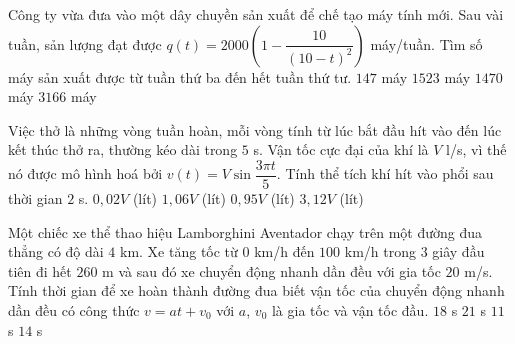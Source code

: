 \begin{ex}%
	Công ty vừa đưa vào một dây chuyền sản xuất để chế tạo máy tính mới. Sau vài tuần, sản lượng đạt được $q(t)=2000\left(1-\dfrac{10}{(10-t)^2}\right)$ máy/tuần. Tìm số máy sản xuất được từ tuần thứ ba đến hết tuần thứ tư. 
	\choice
	{$147$ máy}
	{\True $1523$ máy}
	{$1470$ máy}
	{$3166$ máy}
\end{ex}
\begin{ex}%
	Việc thở là những vòng tuần hoàn, mỗi vòng tính từ lúc bắt đầu hít vào đến lúc kết thúc thở ra, thường kéo dài trong $5$ s. Vận tốc cực đại của khí là $V$ l/s, vì thế nó được mô hình hoá bởi $v(t)=V\sin \dfrac{3\pi t}{5}$. Tính thể tích khí hít vào phổi sau thời gian $2$ s. 
	\choice
	{$0{,}02V$ (lít)}
	{\True $1{,}06V$ (lít)}
	{$0{,}95V$ (lít)}
	{$3{,}12V$ (lít)}
\end{ex}
\begin{ex}%
	Một chiếc xe thể thao hiệu Lamborghini Aventador chạy trên một đường đua thẳng có độ dài $4$ km. Xe tăng tốc từ $0$ km/h đến $100$ km/h trong $3$ giây đầu tiên đi hết $260$ m và sau đó xe chuyển động nhanh dần đều với gia tốc $20$ m/s. Tính thời gian để xe hoàn thành đường đua biết vận tốc của chuyển động nhanh dần đều có công thức $v=at+v_0$ với $a$, $v_0$ là gia tốc và vận tốc đầu. 
	\choice
	{\True $18$ s}
	{$21$ s}
	{$11$ s}
	{$14$ s}
\end{ex}
